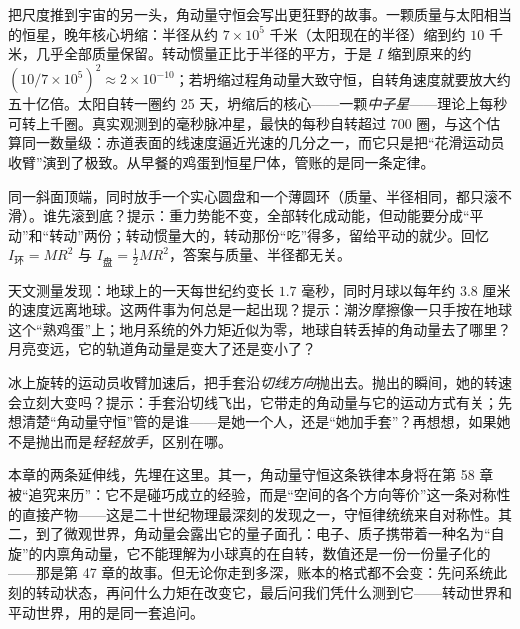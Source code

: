 把尺度推到宇宙的另一头，角动量守恒会写出更狂野的故事。一颗质量与太阳相当的恒星，晚年核心坍缩：半径从约 \(7\times10^5\) 千米（太阳现在的半径）缩到约 \(10\) 千米，几乎全部质量保留。转动惯量正比于半径的平方，于是 \(I\) 缩到原来的约 \((10/7\times10^5)^2\approx2\times10^{-10}\)；若坍缩过程角动量大致守恒，自转角速度就要放大约五十亿倍。太阳自转一圈约 25 天，坍缩后的核心——一颗\emph{中子星}——理论上每秒可转上千圈。真实观测到的毫秒脉冲星，最快的每秒自转超过 700 圈，与这个估算同一数量级：赤道表面的线速度逼近光速的几分之一，而它只是把“花滑运动员收臂”演到了极致。从早餐的鸡蛋到恒星尸体，管账的是同一条定律。

\begin{puzzles}
\item 同一斜面顶端，同时放手一个实心圆盘和一个薄圆环（质量、半径相同，都只滚不滑）。谁先滚到底？提示：重力势能不变，全部转化成动能，但动能要分成“平动”和“转动”两份；转动惯量大的，转动那份“吃”得多，留给平动的就少。回忆 \(I_{\text{环}}=MR^2\) 与 \(I_{\text{盘}}=\tfrac12MR^2\)，答案与质量、半径都无关。
\item 天文测量发现：地球上的一天每世纪约变长 \(1.7\) 毫秒，同时月球以每年约 \(3.8\) 厘米的速度远离地球。这两件事为何总是一起出现？提示：潮汐摩擦像一只手按在地球这个“熟鸡蛋”上；地月系统的外力矩近似为零，地球自转丢掉的角动量去了哪里？月亮变远，它的轨道角动量是变大了还是变小了？
\item 冰上旋转的运动员收臂加速后，把手套沿\emph{切线方向}抛出去。抛出的瞬间，她的转速会立刻大变吗？提示：手套沿切线飞出，它带走的角动量与它的运动方式有关；先想清楚“角动量守恒”管的是谁——是她一个人，还是“她加手套”？再想想，如果她不是抛出而是\emph{轻轻放手}，区别在哪。
\end{puzzles}

本章的两条延伸线，先埋在这里。其一，角动量守恒这条铁律本身将在第 58 章被“追究来历”：它不是碰巧成立的经验，而是“空间的各个方向等价”这一条对称性的直接产物——这是二十世纪物理最深刻的发现之一，守恒律统统来自对称性。其二，到了微观世界，角动量会露出它的量子面孔：电子、质子携带着一种名为“自旋”的内禀角动量，它不能理解为小球真的在自转，数值还是一份一份量子化的——那是第 47 章的故事。但无论你走到多深，账本的格式都不会变：先问系统此刻的转动状态，再问什么力矩在改变它，最后问我们凭什么测到它——转动世界和平动世界，用的是同一套追问。
